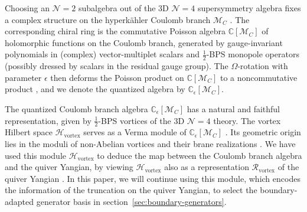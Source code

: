 \documentclass[12pt,a4paper]{article}
\newcommand{\cM}{\mathcal{M}}
\begin{document}
Choosing an $\mathcal N=2$ subalgebra out of the 3D $\mathcal N=4$
supersymmetry algebra fixes a complex structure on the
hyperk\"ahler Coulomb branch $\cM_C$ \cite{BullimoreDimofteGaiotto2017}.  The corresponding chiral ring is the
commutative Poisson algebra $\mathbb C[\cM_C]$ of holomorphic functions on the Coulomb branch, generated by gauge-invariant polynomials in (complex)
vector-multiplet scalars and $\frac{1}{2}$-BPS monopole operators (possibly dressed by scalars in the residual gauge group).  The $\Omega$-rotation with parameter $\epsilon$
then deforms the Poisson product on $\mathbb C[\cM_C]$ to a noncommutative product \cite{Nekrasov_2010,Yagi:2014toa}, and we denote the quantized algebra by
$\mathbb C_\epsilon[\cM_C]$. 


The quantized Coulomb branch algebra $\mathbb C_\epsilon[\cM_C]$ has a natural and faithful representation, given by $\frac 1 2$-BPS vortices of the 3D $\mathcal N=4$ theory. The vortex Hilbert space $\mathcal H_{\text{vortex}}$ serves as a Verma module of $\mathbb C_\epsilon[\cM_C]$ \cite{BullimoreEtAl2018}. Its geometric origin lies in the moduli of
non-Abelian vortices and their brane realizations
\cite{HananyTong2003,EtoEtAl2006,EtoEtAlReview2006}. 
We have used this module $\mathcal H_{\text{vortex}}$ to deduce the map between the Coulomb branch  algebra and the quiver Yangian, by viewing $\mathcal H_{\text{vortex}}$ also as a representation $\mathcal R_{\text{vortex}}$ of the quiver Yangian \cite{ChenLi2026}. In this paper, we will continue using this module, which encodes the information of the truncation on the quiver Yangian, to select the boundary-adapted generator basis in section~\ref{sec:boundary-generators}.
\end{document}
